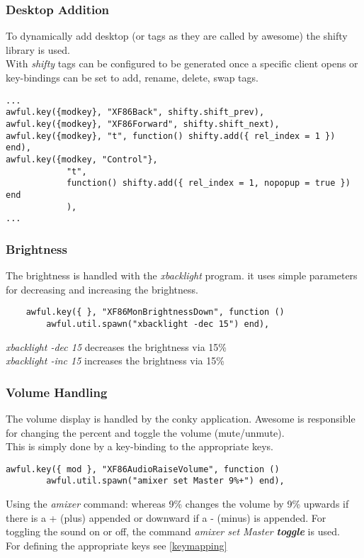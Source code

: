 			\subsubsection{Desktop Addition}%
				To dynamically add desktop (or tags as they are called by awesome) the shifty library is used.\\
				With \textit{shifty} tags can be configured to be generated once a specific client opens or key-bindings can be set to add, rename, delete, swap tags.
				
				\begin{lstlisting}[caption={example of dynamic adding with shifty}]
...
awful.key({modkey}, "XF86Back", shifty.shift_prev),
awful.key({modkey}, "XF86Forward", shifty.shift_next),
awful.key({modkey}, "t", function() shifty.add({ rel_index = 1 }) end),
awful.key({modkey, "Control"},
            "t",
            function() shifty.add({ rel_index = 1, nopopup = true }) end
            ),
...
				\end{lstlisting}
				
			\subsubsection{Brightness}
				The brightness is handled with the \textit{xbacklight} program. it uses simple parameters for decreasing and increasing the brightness.
				\begin{lstlisting}
    awful.key({ }, "XF86MonBrightnessDown", function ()
        awful.util.spawn("xbacklight -dec 15") end),
				\end{lstlisting}
				\textit{xbacklight -dec 15} decreases the brightness via 15\%\\
				\textit{xbacklight -inc 15} increases the brightness via 15\%
				
			\subsubsection{Volume Handling}
				The volume display is handled by the conky application. Awesome is responsible for changing the percent and toggle the volume (mute/unmute).\\
				This is simply done by a key-binding to the appropriate keys.
				\begin{lstlisting}
awful.key({ mod }, "XF86AudioRaiseVolume", function ()
		awful.util.spawn("amixer set Master 9%+") end),
				\end{lstlisting}
				Using the \textit{amixer} command: whereas 9\% changes the volume by 9\% upwards if there is a + (plus) appended or downward if a - (minus) is appended. For toggling the sound on or off, the command \textit{amixer set Master \textbf{toggle}} is used.\\
				For defining the appropriate keys see \ref{keymapping}
				
